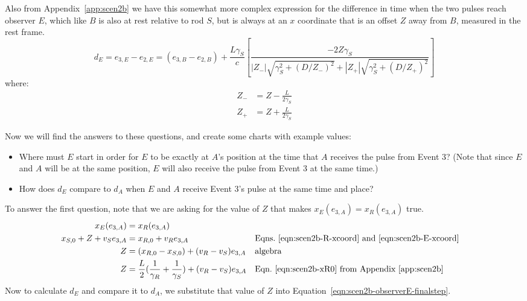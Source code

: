 \documentclass[a4paper]{article}
\theoremstyle{plain}
\theoremstyle{definition}
\begin{document}
Also from Appendix~\ref{app:scen2b} we have this somewhat more complex
expression for the difference in time when the two pulses reach
observer $E$, which like $B$ is also at rest relative to rod $S$, but
is always at an $x$ coordinate that is an offset $Z$ away from $B$,
measured in the rest frame.
\begin{equation}
d_E
  = e_{3,E}-e_{2,E}
  = (e_{3,B}-e_{2,B}) +
  \frac{L\gamma_S}{c} \left[ \frac{-2Z\gamma_S}{|Z_{-}| \sqrt{ \gamma_S^2 + (D/Z_{-})^2 } + |Z_{+}| \sqrt{ \gamma_S^2 + (D/Z_{+})^2 }} \right] \label{eqn:scen2b-observerE-finalstep}
\end{equation}
where:
\begin{align*}
Z_{-} & = Z - \frac{L}{2\gamma_S} \\
Z_{+} & = Z + \frac{L}{2\gamma_S}
\end{align*}

Now we will find the answers to these questions, and create some
charts with example values:
\begin{itemize}
\item Where must $E$ start in order for $E$ to be exactly at $A$'s
  position at the time that $A$ receives the pulse from Event 3?
  (Note that since $E$ and $A$ will be at the same position, $E$ will
  also receive the pulse from Event 3 at the same time.)
\item How does $d_E$ compare to $d_A$ when $E$ and $A$ receive Event
  3's pulse at the same time and place?
\end{itemize}

To answer the first question, note that we are asking for the value of
$Z$ that makes $x_E(e_{3,A}) = x_R(e_{3,A})$ true.
\begin{align}
x_E(e_{3,A}) & = x_R(e_{3,A}) \nonumber \\
x_{S,0} + Z + v_S e_{3,A} & = x_{R,0} + v_R e_{3,A} & & \text{Eqns.~\eqref{eqn:scen2b-R-xcoord} and~\eqref{eqn:scen2b-E-xcoord}} \nonumber \\
Z & = (x_{R,0} - x_{S,0}) + (v_R - v_S) e_{3,A} & & \text{algebra} \nonumber \\
Z & = \frac{L}{2} ( \frac{1}{\gamma_R} + \frac{1}{\gamma_S} ) + (v_R - v_S) e_{3,A} & & \text{Eqn.~\eqref{eqn:scen2b-xR0} from Appendix~\ref{app:scen2b}} \label{eqn:scen2b-Z-where-E-A-rcv-pulse-simultaneously}
\end{align}
Now to calculate $d_E$ and compare it to $d_A$, we substitute that value
of $Z$ into Equation~\eqref{eqn:scen2b-observerE-finalstep}.
\end{document}
